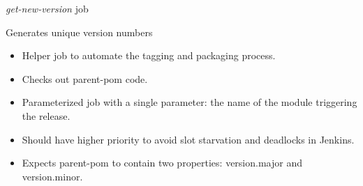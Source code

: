 \documentclass[presentation]{beamer}
\begin{document}
{
\begin{frame}[label=sec-6-2]{\textit{get-new-version} job}

\begin{block}{Generates unique version numbers}

\begin{itemize}
\item Helper job to automate the tagging and packaging process.
\item Checks out parent-pom code.
\item Parameterized job with a single parameter: the name of the module triggering the release.
\item Should have higher priority to avoid slot starvation and deadlocks in Jenkins.
\item Expects parent-pom to contain two properties: version.major and version.minor.
\end{itemize}
\end{block}
\end{frame}
} %

{
\begin{frame}[label=sec-6-3]{}

\begin{columns}
\begin{column}{0.6\textwidth}
\begin{quotation} %

\end{quotation}
\end{column}
\end{columns}
\end{frame}
} %
\end{document}
